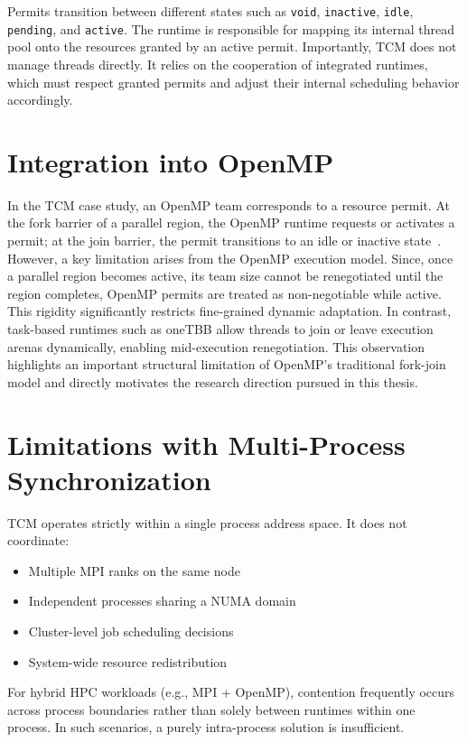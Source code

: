 Permits transition between different states such as \texttt{void}, \texttt{inactive}, \texttt{idle}, \texttt{pending}, and \texttt{active}. The runtime is responsible for mapping its internal thread pool onto the resources granted by an active permit. Importantly, TCM does not manage threads directly. It relies on the cooperation of integrated runtimes, which must respect granted permits and adjust their internal scheduling behavior accordingly.

\section{Integration into OpenMP}

In the TCM case study, an OpenMP team corresponds to a resource permit. At the fork barrier of a parallel region, the OpenMP runtime requests or activates a permit; at the join barrier, the permit transitions to an idle or inactive state~\parencite{fedotov_case_nodate}. However, a key limitation arises from the OpenMP execution model. Since, once a parallel region becomes active, its team size cannot be renegotiated until the region completes, OpenMP permits are treated as non-negotiable while active. This rigidity significantly restricts fine-grained dynamic adaptation. In contrast, task-based runtimes such as oneTBB allow threads to join or leave execution arenas dynamically, enabling mid-execution renegotiation. This observation highlights an important structural limitation of OpenMP's traditional fork-join model and directly motivates the research direction pursued in this thesis.

\section{Limitations with Multi-Process Synchronization}

TCM operates strictly within a single process address space. It does not coordinate:
\begin{itemize}
  \item Multiple MPI ranks on the same node
  \item Independent processes sharing a NUMA domain
  \item Cluster-level job scheduling decisions
  \item System-wide resource redistribution
\end{itemize}

For hybrid HPC workloads (e.g., MPI + OpenMP), contention frequently occurs across process boundaries rather than solely between runtimes within one process. In such scenarios, a purely intra-process solution is insufficient.

